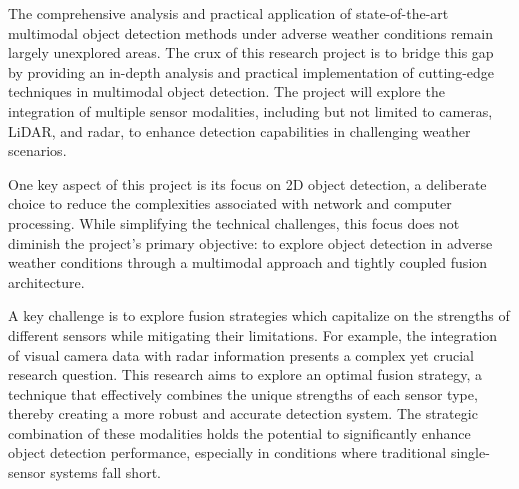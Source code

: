 \documentclass[report.tex]{subfiles}
\begin{document}

    The comprehensive analysis and practical application of state-of-the-art multimodal object detection methods under adverse weather conditions remain largely unexplored areas. The crux of this research project is to bridge this gap by providing an in-depth analysis and practical implementation of cutting-edge techniques in multimodal object detection. The project will explore the integration of multiple sensor modalities, including but not limited to cameras, LiDAR, and radar, to enhance detection capabilities in challenging weather scenarios.

    One key aspect of this project is its focus on 2D object detection, a deliberate choice to reduce the complexities associated with network and computer processing. While simplifying the technical challenges, this focus does not diminish the project's primary objective: to explore object detection in adverse weather conditions through a multimodal approach and tightly coupled fusion architecture.
    
    
    A key challenge is to explore fusion strategies which capitalize on the strengths of different sensors while mitigating their limitations. For example, the integration of visual camera data with radar information presents a complex yet crucial research question. This research aims to explore an optimal fusion strategy, a technique that effectively combines the unique strengths of each sensor type, thereby creating a more robust and accurate detection system. The strategic combination of these modalities holds the potential to significantly enhance object detection performance, especially in conditions where traditional single-sensor systems fall short.

\end{document}
